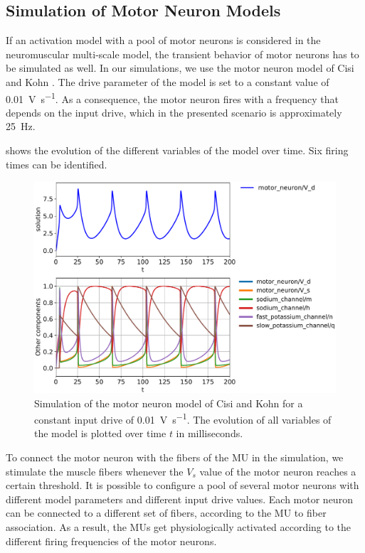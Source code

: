 \subsection{Simulation of Motor Neuron Models}

If an activation model with a pool of motor neurons is considered in the neuromuscular multi-scale model, the transient behavior of motor neurons has to be simulated as well. In our simulations, we use the motor neuron model of Cisi and Kohn \cite{Cisi2008}. The drive parameter of the model is set to a constant value of \SI{0.01}{\volt\per\second}. As a consequence, the motor neuron fires with a frequency that depends on the input drive, which in the presented scenario is approximately \SI{25}{\hertz}.

 shows the evolution of the different variables of the model over time. Six firing times can be identified. 

\begin{figure}
  \centering%
  \includegraphics[width=\textwidth]{images/results/basic/motoneuron_plot.pdf}%
  \caption{Simulation of the motor neuron model of Cisi and Kohn \cite{Cisi2008} for a constant input drive of  \SI{0.01}{\volt\per\second}. The evolution of all variables of the model is plotted over time $t$ in milliseconds.}%
  \label{fig:motoneuron_plot}%
\end{figure}%

To connect the motor neuron with the fibers of the MU in the simulation, we stimulate the muscle fibers whenever the $V_s$ value of the motor neuron reaches a certain threshold. It is possible to configure a pool of several motor neurons with different model parameters and different input drive values. Each motor neuron can be connected to a different set of fibers, according to the MU to fiber association. As a result, the MUs get physiologically activated according to the different firing frequencies of the motor neurons.

